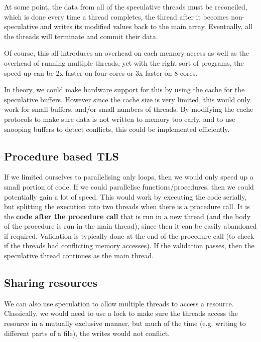 At some point, the data from all of the speculative threads must be
reconciled, which is done every time a thread completes, the thread
after it becomes non-speculative and writes its modified values back
to the main array. Eventually, all the threads will terminate and
commit their data.


Of course, this all introduces an overhead on each memory access as
well as the overhead of running multiple threads, yet with the right
sort of programs, the speed up can be 2x faster on four cores or 3x
faster on 8 cores.

In theory, we could make hardware support for this by using the cache
for the speculative buffers. However since the cache size is very
limited, this would only work for small buffers, and/or small numbers
of threads. By modifying the cache protocols to make sure data is not
written to memory too early, and to use snooping buffers to detect
conflicts, this could be implemented efficiently.

\subsection{Procedure based TLS}

If we limited ourselves to parallelising only loops, then we would
only speed up a small portion of code. If we could parallelise
functions/procedures, then we could potentially gain a lot of
speed. This would work by executing the code serially, but splitting
the execution into two threads when there is a procedure call. It is
the \textbf{code after the procedure call} that is run in a new thread
(and the body of the procedure is run in the main thread), since then
it can be easily abandoned if required. Validation is typically done
at the end of the procedure call (to check if the threads had
conflicting memory accesses). If the validation passes, then the
speculative thread continues as the main thread.

\subsection{Sharing resources}

We can also use speculation to allow multiple threads to access a
resource. Classically, we would need to use a lock to make sure the
threads access the resource in a mutually exclusive manner, but much
of the time (e.g. writing to different parts of a file), the writes
would not conflict.

